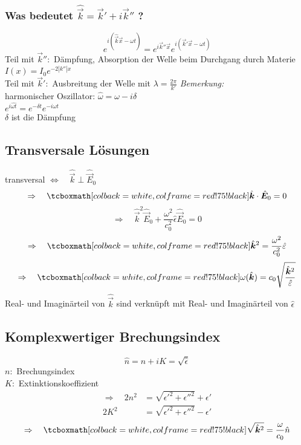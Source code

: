 \subsubsection{Was bedeutet $ \hat{\vec{k}} = \vec{k}' + i \vec{k}'' $ ?}

\begin{equation*}
e^{i(\hat{\vec{k}} \vec{x} - \omega t)} = e^{i \vec{k}'' \vec{x}} e^{i(\vec{k}' \vec{x} - \omega t)}
\end{equation*}
Teil mit $ \vec{k}'' : $ Dämpfung, Absorption der Welle beim Durchgang durch Materie $ I(x) = I_0 e^{-2 |k''| x} $\\
Teil mit $ \vec{k}' : $ Ausbreitung der Welle mit $ \lambda = \frac{2 \pi}{k'} $
\emph{Bemerkung:}\\
harmonischer Oszillator: $ \hat{\omega} = \omega - i \delta $\\
$ e^{i\hat{\omega t}} = e^{-\delta t} e^{-i \omega t} $\\
$ \delta $ ist die Dämpfung

\subsection{Transversale Lösungen}

transversal $ \Leftrightarrow \quad \hat{\vec{k}} \perp \hat{\vec{E}}_0 $ 
\begin{equation*}
\Rightarrow \quad \rmbox{\hat{\vec{k}} \cdot \hat{\vec{E}}_0 = 0}
\end{equation*}
\begin{equation*}
\Rightarrow \quad \hat{\vec{k}}^2 \hat{\vec{E}}_0 + \frac{\omega^2}{c_0^2} \hat{\epsilon} \hat{\vec{E}}_0 = 0
\end{equation*}
\begin{equation*}
\Rightarrow \quad \rmbox{\hat{\vec{k}}^2 = \frac{\omega^2}{c_0^2} \hat{\epsilon}}
\end{equation*}
\begin{equation*}
\Rightarrow \quad \rmbox{\omega(\hat{\vec{k}}) = c_0 \sqrt{\frac{\hat{\vec{k}}^2}{\hat{\epsilon}}}}
\end{equation*}
Real- und Imaginärteil von $ \hat{\vec{k}} $ sind verknüpft mit Real- und Imaginärteil von $ \hat{\epsilon} $

\subsection{Komplexwertiger Brechungsindex}

\begin{equation*}
\hat{n} = n + i K = \sqrt{\hat{\epsilon}}
\end{equation*}
$ n : $ Brechungsindex\\
$ K : $ Extinktionskoeffizient
\begin{align*}
\Rightarrow \quad 2 n^2 &= \sqrt{\epsilon'^2 + \epsilon''^2} + \epsilon'\\
2 K^2 &= \sqrt{\epsilon'^2 + \epsilon''^2} - \epsilon'
\end{align*}
\begin{equation*}
\Rightarrow \quad \rmbox{\sqrt{\hat{\vec{k}}^2 } = \frac{\omega}{c_0} \hat{n}}
\end{equation*}

